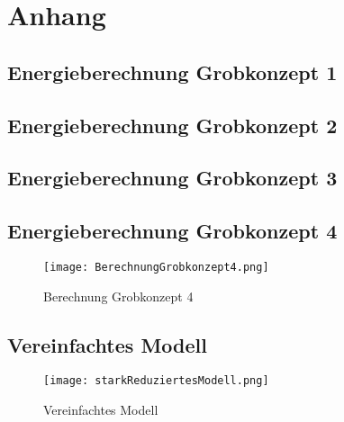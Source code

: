 \section{Anhang} \label{sec:anhang}

\subsection{Energieberechnung Grobkonzept 1} \label{subsec:grobkonzept1}

\subsection{Energieberechnung Grobkonzept 2} \label{subsec:grobkonzept2}

\subsection{Energieberechnung Grobkonzept 3} \label{subsec:grobkonzept3}

\subsection{Energieberechnung Grobkonzept 4} \label{subsec:grobkonzept4}
\begin{figure} [H]
	\centering
	\texttt{[image: BerechnungGrobkonzept4.png]}
	\caption{Berechnung Grobkonzept 4}
	\label{fig:BerechnungGrobkonzept4}

\end{figure}

\subsection{Vereinfachtes Modell} \label{subsec:vereinfachtesModel}
\begin{figure} [H]
	\centering
	\texttt{[image: starkReduziertesModell.png]}
	\caption{Vereinfachtes Modell}
	\label{fig:VereinfachtesModel}
\end{figure}